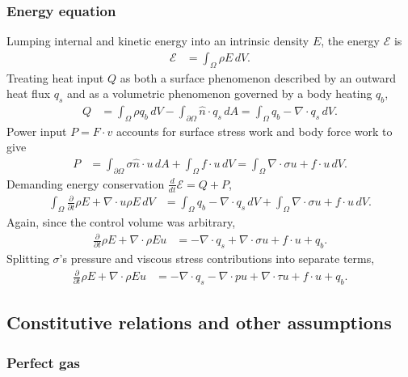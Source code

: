 \documentclass[letterpaper,11pt,nointlimits,reqno,draft]{amsart}
\begin{document}
\subsubsection{Energy equation}
Lumping internal and kinetic energy into an intrinsic density $E$,
the energy $\mathscr{E}$ is
\begin{align}
  \mathscr{E} &= \int_{\Omega} \rho{}E \, dV
  .
\end{align}
Treating heat input $Q$ as both a surface phenomenon described by an outward
heat flux $q_{s}$ and as a volumetric phenomenon governed by a
body heating $q_{b}$,
\begin{align}
  Q
  &=
   \int_{\Omega}\rho{}q_{b}\,dV
  -\int_{\partial\Omega}\hat{n}\cdot{}q_{s}\,dA
  =
    \int_{\Omega}q_{b} - \nabla\cdot{}q_{s}\,dV
  .
\end{align}
Power input $P=F\cdot{}v$ accounts for surface stress work and body
force work to give
\begin{align}
  P
  &=
    \int_{\partial\Omega} \sigma{}\hat{n} \cdot{} u \, dA
  + \int_{\Omega} f \cdot{} u \, dV
  = \int_{\Omega} \nabla\cdot{}\sigma{}u + f \cdot{} u \, dV
  .
\end{align}
Demanding energy conservation $\frac{d}{dt}\mathscr{E}=Q+P$,
\begin{align}
  \int_{\Omega}\frac{\partial}{\partial{}t} \rho{}E
  +
  \nabla\cdot{}u\rho{}E
  \,dV
&=
    \int_{\Omega} q_{b} - \nabla\cdot{}q_{s}\,dV
  + \int_{\Omega} \nabla\cdot\sigma{}u + f \cdot{} u \, dV
  .
\end{align}
Again, since the control volume was arbitrary,
\begin{align}
  \frac{\partial}{\partial{}t} \rho{}E
  +
  \nabla\cdot{}\rho{}Eu
&=
  - \nabla\cdot{}q_{s}
  + \nabla\cdot\sigma{}u
  + f \cdot{} u
  + q_{b}
  .
\end{align}
Splitting $\sigma$'s pressure and viscous stress contributions into separate
terms,
\begin{align}
  \label{eq:cons_energy}
  \frac{\partial}{\partial{}t} \rho{}E
  +
  \nabla\cdot{}\rho{}Eu
&=
  - \nabla\cdot{}q_{s}
  - \nabla\cdot{}pu
  + \nabla\cdot{}\tau{}u
  + f \cdot{} u
  + q_{b}
  .
\end{align}

\subsection{Constitutive relations and other assumptions}
\label{sec:constitutive}

\subsubsection{Perfect gas}
\end{document}
